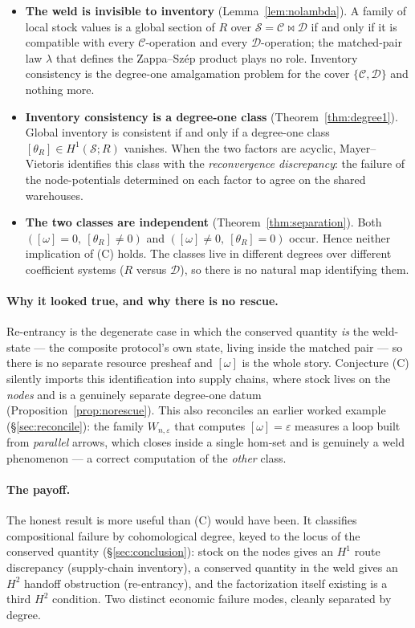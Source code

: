 \documentclass[11pt]{article}
\theoremstyle{definition}
\newcommand{\Sc}{\mathcal{S}}
\newcommand{\C}{\mathcal{C}}
\newcommand{\D}{\mathcal{D}}
\newcommand{\bowtiemap}{\bowtie}
\begin{document}
\begin{itemize}
\item \textbf{The weld is invisible to inventory} (Lemma~\ref{lem:nolambda}). A family of local
stock values is a global section of $R$ over $\Sc=\C\bowtiemap\D$ if and only if it is
compatible with every $\C$-operation and every $\D$-operation; the matched-pair law
$\lambda$ that defines the Zappa--Sz\'ep product plays no role. Inventory consistency is the
degree-one amalgamation problem for the cover $\{\C,\D\}$ and nothing more.

\item \textbf{Inventory consistency is a degree-one class} (Theorem~\ref{thm:degree1}). Global
inventory is consistent if and only if a degree-one class $[\theta_R]\in H^1(\Sc;R)$ vanishes.
When the two factors are acyclic, Mayer--Vietoris identifies this class with the
\emph{reconvergence discrepancy}: the failure of the node-potentials determined on each factor
to agree on the shared warehouses.

\item \textbf{The two classes are independent} (Theorem~\ref{thm:separation}). Both
$([\omega]=0,\ [\theta_R]\neq0)$ and $([\omega]\neq0,\ [\theta_R]=0)$ occur. Hence neither
implication of (C) holds. The classes live in different degrees over different coefficient
systems ($R$ versus $\D$), so there is no natural map identifying them.
\end{itemize}

\paragraph{Why it looked true, and why there is no rescue.} Re-entrancy is the degenerate case
in which the conserved quantity \emph{is} the weld-state --- the composite protocol's own state,
living inside the matched pair --- so there is no separate resource presheaf and $[\omega]$ is
the whole story. Conjecture (C) silently imports this identification into supply chains, where
stock lives on the \emph{nodes} and is a genuinely separate degree-one datum
(Proposition~\ref{prop:norescue}). This also reconciles an earlier worked example
(\S\ref{sec:reconcile}): the family $W_{n,\varepsilon}$ that computes $[\omega]=\varepsilon$
measures a loop built from \emph{parallel} arrows, which closes inside a single hom-set and is
genuinely a weld phenomenon --- a correct computation of the \emph{other} class.

\paragraph{The payoff.} The honest result is more useful than (C) would have been. It
classifies compositional failure by cohomological degree, keyed to the locus of the conserved
quantity (\S\ref{sec:conclusion}): stock on the nodes gives an $H^1$ route discrepancy
(supply-chain inventory), a conserved quantity in the weld gives an $H^2$ handoff obstruction
(re-entrancy), and the factorization itself existing is a third $H^2$ condition. Two distinct
economic failure modes, cleanly separated by degree.
\end{document}
